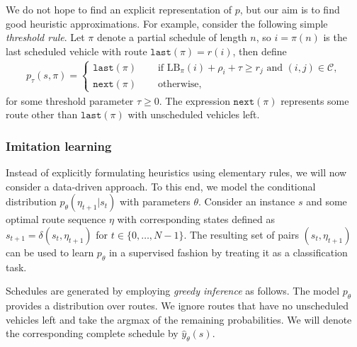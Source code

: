 \documentclass{article}
\theoremstyle{definition}
\theoremstyle{plain}
\begin{document}
We do not hope to find an explicit representation of $p$, but our aim is to find
good heuristic approximations.
For example, consider the following simple \textit{threshold rule}.
%
Let $\pi$ denote a partial schedule of length $n$, so $i=\pi(n)$ is the last
scheduled vehicle with route $\texttt{last}(\pi)=r(i)$, then define
\begin{align*}
  p_{\tau}(s, \pi) = \begin{cases}
                \texttt{last}(\pi) \quad &\text{ if } \text{LB}_{\pi}(i) + \rho_{i} + \tau \geq r_{j} \text{ and } (i,j) \in \mathcal{C} , \\
                \texttt{next}(\pi) & \text{ otherwise, }
              \end{cases}
\end{align*}
for some threshold parameter $\tau \geq 0$. The expression $\texttt{next}(\pi)$ represents some
route other than $\texttt{last}(\pi)$ with unscheduled vehicles left.


\subsubsection{Imitation learning}


Instead of explicitly formulating heuristics using elementary rules, we will now
consider a data-driven approach. To this end, we model the conditional
distribution $p_{\theta}(\eta_{t+1} | s_{t})$ with parameters $\theta$.
%
Consider an instance $s$ and some optimal route sequence $\eta$ with
corresponding states defined as $s_{t+1} = \delta(s_{t}, \eta_{t+1})$ for
$t \in \{0, \dots, N-1\}$. The resulting set of pairs $(s_{t}, \eta_{t+1})$ can be
used to learn $p_{\theta}$ in a supervised fashion by treating it as a classification
task.

Schedules are generated by employing \textit{greedy inference} as follows. The
model $p_{\theta}$ provides a distribution over routes. We ignore routes that have
no unscheduled vehicles left and take the argmax of the remaining probabilities.
We will denote the corresponding complete schedule by $\hat{y}_{\theta}(s)$.
\end{document}
